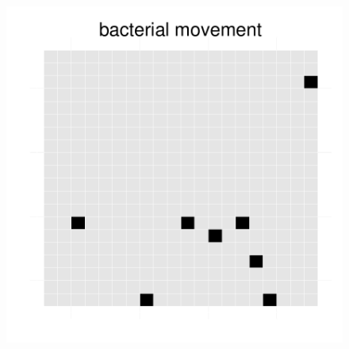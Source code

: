 \begin{figure}[h!]
{\begin{minipage}[t]{0.3\textwidth}
  \end{minipage}
  \begin{minipage}[t]{0.3\textwidth}
    \includegraphics[width=\textwidth]{../results/beijerinckii_20x20_seed943_bac65.pdf}
  \end{minipage}
  }
\end{figure}
